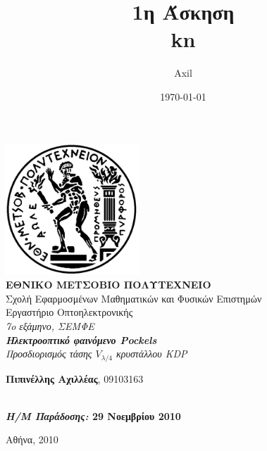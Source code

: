 \documentclass[a4paper,11pt,titlepage]{article}
\title{1η Άσκηση\\
    kn}
\author{Axil}
\date{\today}
\begin{document}
\pagestyle{headings}    %

\begin{titlepage}
\begin{center}
\includegraphics[width=50mm]{pyrforos.pdf}\\[0.5cm]
\textbf{\LARGE ΕΘΝΙΚΟ ΜΕΤΣΟΒΙΟ ΠΟΛΥΤΕΧΝΕΙΟ}\\
        \textrm{\Large Σχολή Εφαρμοσμένων Μαθηματικών και Φυσικών Επιστημών}\\[2.0cm]
            \Huge{
                Εργαστήριο Οπτοηλεκτρονικής\\
            }
\Large{\textit{7o
    εξάμηνο, ΣΕΜΦΕ}}\\[2.0cm]
        \Large{\textit{\textbf{Ηλεκτροοπτικό φαινόμενο Pockels}\\Προσδιορισμός τάσης $V_{\lambda /4}$ κρυστάλλου KDP}}\\[5.0cm]
                \normalsize

                \begin{minipage}{0.49\textwidth}
                \begin{flushleft}
                                \textbf{Πιπινέλλης
                                    Αχιλλέας},
                                    09103163
                                    \end{flushleft}
                                    \end{minipage}
                                    \begin{minipage}{0.49\textwidth}
                                    \begin{flushright}
                                    \textbf{
                                        \\
                                            \textit{Η/Μ
                                                Παράδοσης:}
                                        29
                                            Νοεμβρίου
                                            2010
                                    }
\end{flushright}
\end{minipage}


\vfill
{Αθήνα, 2010}

\end{center}
\end{titlepage}
\end{document}
